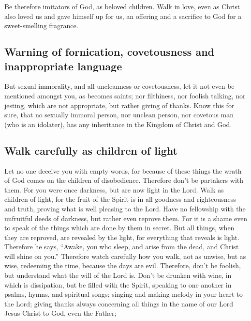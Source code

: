  Be therefore imitators of God, as beloved children.
 Walk in love, even as Christ also loved us and gave
himself up for us, an offering and a sacrifice to God for a
sweet-smelling fragrance.

\hypertarget{warning-of-fornication-covetousness-and-inappropriate-language}{%
\subsection{Warning of fornication, covetousness and inappropriate
language}\label{warning-of-fornication-covetousness-and-inappropriate-language}}

 But sexual immorality, and all uncleanness or
covetousness, let it not even be mentioned amongst you, as becomes
saints;  nor filthiness, nor foolish talking, nor jesting,
which are not appropriate, but rather giving of thanks. 
Know this for sure, that no sexually immoral person, nor unclean person,
nor covetous man (who is an idolater), has any inheritance in the
Kingdom of Christ and God.

\hypertarget{walk-carefully-as-children-of-light}{%
\subsection{Walk carefully as children of
light}\label{walk-carefully-as-children-of-light}}

 Let no one deceive you with empty words, for because of
these things the wrath of God comes on the children of disobedience.
 Therefore don't be partakers with them. 
For you were once darkness, but are now light in the Lord. Walk as
children of light,  for the fruit of the Spirit is in all
goodness and righteousness and truth,  proving what is
well pleasing to the Lord.  Have no fellowship with the
unfruitful deeds of darkness, but rather even reprove them.
 For it is a shame even to speak of the things which are
done by them in secret.  But all things, when they are
reproved, are revealed by the light, for everything that reveals is
light.  Therefore he says, ``Awake, you who sleep, and
arise from the dead, and Christ will shine on you.'' 
Therefore watch carefully how you walk, not as unwise, but as wise,
 redeeming the time, because the days are evil.
 Therefore, don't be foolish, but understand what the
will of the Lord is.  Don't be drunken with wine, in
which is dissipation, but be filled with the Spirit, 
speaking to one another in psalms, hymns, and spiritual songs; singing
and making melody in your heart to the Lord;  giving
thanks always concerning all things in the name of our Lord Jesus Christ
to God, even the Father;


